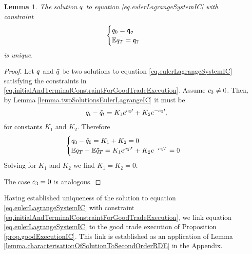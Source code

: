 \documentclass[10pt,a4paper]{article}
\newtheorem{lemma}[thm]{Lemma}
\begin{document}
	\begin{lemma}
		\label{lemma.uniquenessOfEulerLagrangeIC}
		The solution $q$ to equation \eqref{eq.eulerLagrangeSystemIC} with constraint
		\begin{equation}\label{eq.initialAndTerminalConstraintForGoodTradeExecution}
		\begin{cases}
		q_0 = \mathfrak{q_0} \\
		\mathbb{{E}} q_T = \mathfrak{q}_{\mathtt{T} } 
		\end{cases}
		\end{equation}
		is unique. 
	\end{lemma}
	\begin{proof}
		Let  $q$ and $\tilde{q}$ be two solutions to equation \eqref{eq.eulerLagrangeSystemIC} satisfying the constraints in \eqref{eq.initialAndTerminalConstraintForGoodTradeExecution}. Assume $c_{3} \neq 0$. Then, by Lemma \ref{lemma.twoSolutionsEulerLagrangeIC} it must be
		\begin{equation*}
		q_t - \tilde{q}_t = K_1 e^{c_{3} t } + K_2 e^{-c_{3} t},
		\end{equation*}
		for constants $K_1$ and $K_2$. Therefore 
		\begin{equation*}
		\begin{cases}
		q_0 - \tilde{q}_0 = K_1 + K_2 =0 \\
		\mathbb{{E}} q_T  - \mathbb{{E}} \tilde{q}_T =
		 K_1 e^{c_{3}T } + K_2 e^{-c_{3}T } =0
		\end{cases}
		\end{equation*}
		Solving for  $K_1$ and $K_2$ we find $K_1=K_2=0$. 
		
		The case  $c_{3} = 0$ is analogous. 
	\end{proof}
	Having established uniqueness of the solution to   equation \eqref{eq.eulerLagrangeSystemIC} with constraint \eqref{eq.initialAndTerminalConstraintForGoodTradeExecution}, we link equation \eqref{eq.eulerLagrangeSystemIC} to the good trade execution of Proposition \ref{prop.goodExecutionIC}. This link is established as an application of Lemma \ref{lemma.characterisationOfSolutionToSecondOrderRDE} in the Appendix. 
	
\end{document}
